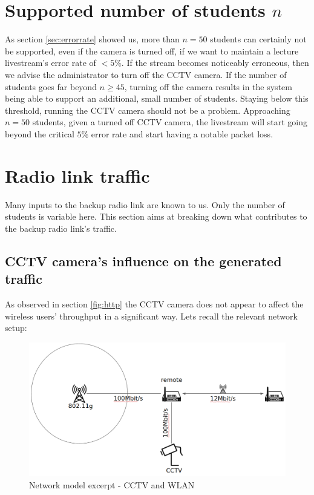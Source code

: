 \documentclass[a4paper]{scrreprt}
\begin{document}
		\section{Supported number of students $n$}
		As section \ref{sec:errorrate} showed us, more than $n=50$ students can certainly not be supported, even if the camera is turned off, if we want to maintain a lecture livestream's error rate of $<5\%$. If the stream becomes noticeably erroneous, then we advise the administrator to turn off the CCTV camera. If the number of students goes far beyond $n\geq 45$, turning off the camera results in the system being able to support an additional, small number of students. Staying below this threshold, running the CCTV camera should not be a problem. Approaching $n=50$ students, given a turned off CCTV camera, the livestream will start going beyond the critical $5\%$ error rate and start having a notable packet loss.	
		
		\section{Radio link traffic}
		Many inputs to the backup radio link are known to us. Only the number of students is variable here. This section aims at breaking down what contributes to the backup radio link's traffic.
		
			\subsection{CCTV camera's influence on the generated traffic}\label{sec:cctvinfluence}
			As observed in section \ref{fig:http} the CCTV camera does not appear to affect the wireless users' throughput in a significant way. Lets recall the relevant network setup:
			
			\begin{figure}[H]
				\center\includegraphics[width=\textwidth]{./simmodel_cctv_vs_wlan.png}
				\caption{Network model excerpt - CCTV and WLAN}
			\end{figure}
			
\end{document}
